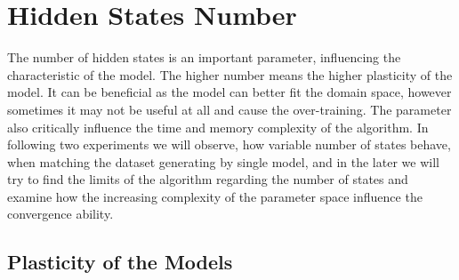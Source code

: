 \documentclass[thesis=M,english]{FITthesis}[2012/10/20]
\begin{document}
\section{Hidden States Number}\label{sec:hsn}

The number of hidden states is an important parameter, influencing the characteristic of the model. The higher number means the higher plasticity of the model. It can be beneficial as the model can better fit the domain space, however sometimes it may not be useful at all and cause the over-training. The parameter also critically influence the time and memory complexity of the algorithm. In following two experiments we will observe, how variable number of states behave, when matching the dataset generating by single model, and in the later we will try to find the limits of the algorithm regarding the number of states and examine how the increasing complexity of the parameter space influence the convergence ability.    

\subsection{Plasticity of the Models}\label{sec:plast}
\end{document}
